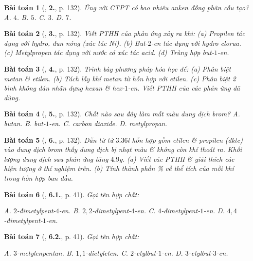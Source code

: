 \documentclass{article}
\numberwithin{equation}{section}
\newtheorem{baitoan}{Bài toán}[section]
\begin{document}
\begin{baitoan}[\cite{SGK_Hoa_Hoc_11_co_ban}, \textbf{2.}, p. 132]
	Ứng với CTPT \emph{} có bao nhiêu anken đồng phân cấu tạo? {\sf A.} $4$. {\sf B.} $5$. {\sf C.} $3$. {\sf D.} $7$.
\end{baitoan}

\begin{baitoan}[\cite{SGK_Hoa_Hoc_11_co_ban}, \textbf{3.}, p. 132]
	Viết PTHH của phản ứng xảy ra khi: (a) Propilen tác dụng với hydro, đun nóng (xúc tác \emph{Ni}). (b) But-$2$-en tác dụng với hydro clorua. (c) Metylpropen tác dụng với nước có xúc tác acid. (d) Trùng hợp but-$1$-en.
\end{baitoan}

\begin{baitoan}[\cite{SGK_Hoa_Hoc_11_co_ban}, \textbf{4.}, p. 132]
	Trình bày phương pháp hóa học để: (a) Phân biệt metan \& etilen. (b) Tách lấy khí metan từ hỗn hợp với etilen. (c) Phân biệt 2 bình không dán nhãn đựng hexan \& hex-$1$-en. Viết PTHH của các phản ứng đã dùng.
\end{baitoan}

\begin{baitoan}[\cite{SGK_Hoa_Hoc_11_co_ban}, \textbf{5.}, p. 132]
	Chất nào sau đây làm mất màu dung dịch brom? {\sf A.} butan. {\sf B.} but-$1$-en. {\sf C.} carbon dioxide. {\sf D.} metylpropan.
\end{baitoan}

\begin{baitoan}[\cite{SGK_Hoa_Hoc_11_co_ban}, \textbf{6.}, p. 132]
	Dẫn từ từ $3.36$\emph{l} hỗn hợp gồm etilen \& propilen (đktc) vào dung dịch brom thấy dung dịch bị nhạt màu \& không còn khí thoát ra. Khối lượng dung dịch sau phản ứng tăng $4.9$\emph{g}. (a) Viết các PTHH \& giải thích các hiện tượng ở thí nghiệm trên. (b) Tính thành phần \% về thể tích của mỗi khí trong hỗn hợp ban đầu.
\end{baitoan}

\begin{baitoan}[\cite{SBT_Hoa_Hoc_11_co_ban}, \textbf{6.1.}, p. 41]
	Gọi tên hợp chất:
	\begin{center}
	\end{center}
	{\sf A.} $2$-đimetylpent-$4$-en. {\sf B.} $2,2$-đimetylpent-$4$-en. {\sf C.} $4$-đimetylpent-$1$-en. {\sf D.} $4,4$-đimetylpent-$1$-en.
\end{baitoan}

\begin{baitoan}[\cite{SBT_Hoa_Hoc_11_co_ban}, \textbf{6.2.}, p. 41]
	Gọi tên hợp chất:
	\begin{center}
	\end{center}
	{\sf A.} $3$-metylenpentan. {\sf B.} $1,1$-đietyleten. {\sf C.} $2$-etylbut-$1$-en. {\sf D.} $3$-etylbut-$3$-en.
\end{baitoan}
\end{document}
